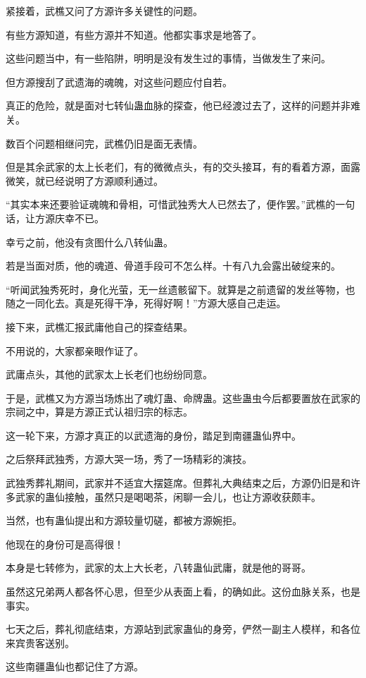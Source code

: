 \begin{this_body}
紧接着，武樵又问了方源许多关键性的问题。

有些方源知道，有些方源并不知道。他都实事求是地答了。

这些问题当中，有一些陷阱，明明是没有发生过的事情，当做发生了来问。

但方源搜刮了武遗海的魂魄，对这些问题应付自若。

真正的危险，就是面对七转仙蛊血脉的探查，他已经渡过去了，这样的问题并非难关。

数百个问题相继问完，武樵仍旧是面无表情。

但是其余武家的太上长老们，有的微微点头，有的交头接耳，有的看着方源，面露微笑，就已经说明了方源顺利通过。

“其实本来还要验证魂魄和骨相，可惜武独秀大人已然去了，便作罢。”武樵的一句话，让方源庆幸不已。

幸亏之前，他没有贪图什么八转仙蛊。

若是当面对质，他的魂道、骨道手段可不怎么样。十有八九会露出破绽来的。

“听闻武独秀死时，身化光萤，无一丝遗骸留下。就算是之前遗留的发丝等物，也随之一同化去。真是死得干净，死得好啊！”方源大感自己走运。

接下来，武樵汇报武庸他自己的探查结果。

不用说的，大家都亲眼作证了。

武庸点头，其他的武家太上长老们也纷纷同意。

于是，武樵又为方源当场炼出了魂灯蛊、命牌蛊。这些蛊虫今后都要置放在武家的宗祠之中，算是方源正式认祖归宗的标志。

这一轮下来，方源才真正的以武遗海的身份，踏足到南疆蛊仙界中。

之后祭拜武独秀，方源大哭一场，秀了一场精彩的演技。

武独秀葬礼期间，武家并不适宜大摆筵席。但葬礼大典结束之后，方源仍旧是和许多武家的蛊仙接触，虽然只是喝喝茶，闲聊一会儿，也让方源收获颇丰。

当然，也有蛊仙提出和方源较量切磋，都被方源婉拒。

他现在的身份可是高得很！

本身是七转修为，武家的太上大长老，八转蛊仙武庸，就是他的哥哥。

虽然这兄弟两人都各怀心思，但至少从表面上看，的确如此。这份血脉关系，也是事实。

七天之后，葬礼彻底结束，方源站到武家蛊仙的身旁，俨然一副主人模样，和各位来宾贵客送别。

这些南疆蛊仙也都记住了方源。


\end{this_body}
